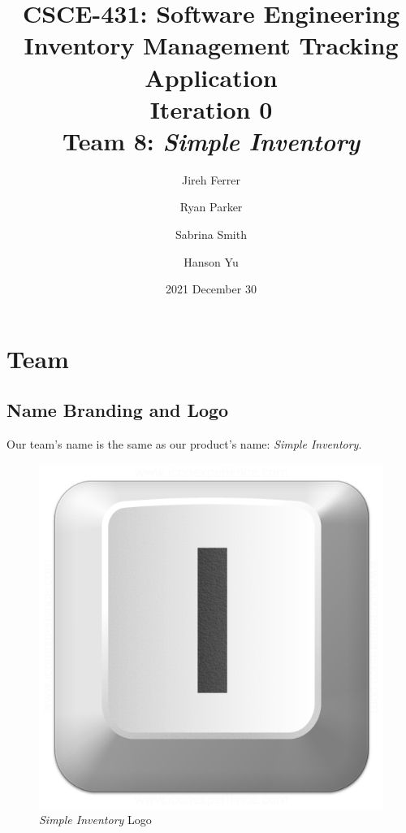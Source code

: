 \documentclass{article}
\title{\Huge{\textbf{CSCE-431: Software Engineering}\\\vspace{0.75cm}Inventory Management Tracking Application\\\huge Iteration 0}\\\vspace{1cm}\huge Team 8:  \textit{Simple Inventory}}
\author{ \Large Jireh Ferrer
    \and
        \Large Ryan Parker
    \and
        \Large Sabrina Smith
    \and
        \Large Hanson Yu }
\date{ \vspace{1cm} \large 2021 December 30 }
\begin{document}
\thispagestyle{empty}
\maketitle
\setcounter{secnumdepth}{0}

\thispagestyle{empty}
\pagebreak
\tableofcontents
\thispagestyle{empty}
\pagebreak
\thispagestyle{fancy}
\renewcommand{\sectionmark}[1]{\markright{#1}{}}
\setcounter{page}{1}
    \section{Team}
        \subsection{Name Branding and Logo}
            Our team's name is the same as our product's name: \textit{Simple Inventory}.
            \begin{figure}[!htb]
                \quad\quad\quad\quad\quad\quad\quad\quad\quad\quad\quad\quad\quad\quad\quad\quad\quad\quad\quad\includegraphics[scale=0.15]{resources/keyboard_key_i.png}
                \caption{\textit{Simple Inventory} Logo}
                \label{fig:Diagram 3}
            \end{figure}
            
\end{document}
